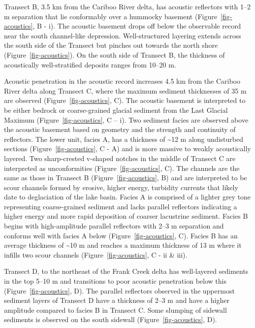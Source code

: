 \documentclass[
  letterpaper,
  DIV=11,
  numbers=noendperiod]{scrartcl}
\begin{document}
Transect B, 3.5 km from the Cariboo River delta, has acoustic reflectors
with 1--2 m separation that lie conformably over a hummocky basement
(Figure~\ref{fig-acoustics}, B - i). The acoustic basement drops off
below the observable record near the south channel-like depression.
Well-structured layering extends across the south side of the Transect
but pinches out towards the north shore (Figure~\ref{fig-acoustics}). On
the south side of Transect B, the thickness of acoustically
well-stratified deposits ranges from 10--20 m.

Acoustic penetration in the acoustic record increases 4.5 km from the
Cariboo River delta along Transect C, where the maximum sediment
thicknesses of 35 m are observed (Figure~\ref{fig-acoustics}, C). The
acoustic basement is interpreted to be either bedrock or coarse-grained
glacial sediment from the Last Glacial Maximum
(Figure~\ref{fig-acoustics}, C -- i). Two sediment facies are observed
above the acoustic basement based on geometry and the strength and
continuity of reflectors. The lower unit, facies A, has a thickness of
\textasciitilde12 m along undisturbed sections
(Figure~\ref{fig-acoustics}, C - A) and is more massive to weakly
acoustically layered. Two sharp-crested v-shaped notches in the middle
of Transect C are interpreted as unconformities
(Figure~\ref{fig-acoustics}, C). The channels are the same as those in
Transect B (Figure~\ref{fig-acoustics}, B) and are interpreted to be
scour channels formed by erosive, higher energy, turbidity currents that
likely date to deglaciation of the lake basin. Facies A is comprised of
a lighter grey tone representing coarse-grained sediment and lacks
parallel reflectors indicating a higher energy and more rapid deposition
of coarser lacustrine sediment. Facies B begins with high-amplitude
parallel reflectors with 2--3 m separation and conforms well with facies
A below (Figure~\ref{fig-acoustics}, C). Facies B has an average
thickness of \textasciitilde10 m and reaches a maximum thickness of 13 m
where it infills two scour channels (Figure~\ref{fig-acoustics}, C - ii
\& iii).

Transect D, to the northeast of the Frank Creek delta has well-layered
sediments in the top 5--10 m and transitions to poor acoustic
penetration below this (Figure~\ref{fig-acoustics}, D). The parallel
reflectors observed in the uppermost sediment layers of Transect D have
a thickness of 2--3 m and have a higher amplitude compared to facies B
in Transect C. Some slumping of sidewall sediments is observed on the
south sidewall (Figure~\ref{fig-acoustics}, D).
\end{document}
